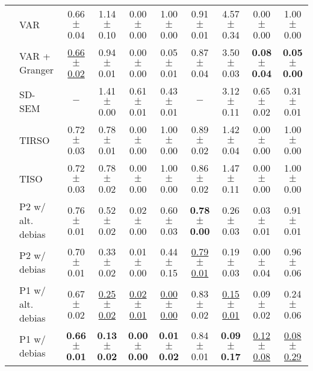 \begin{table*}[t]
\begin{tabular}{@{}c|l|c!{\hspace{.25em}}c!{\hspace{.25em}}c!{\hspace{.25em}}c!{\hspace{.25em}}|c!{\hspace{.25em}}c!{\hspace{.25em}}c!{\hspace{.25em}}c@{}}
& VAR & 0.66{\scriptsize$\pm$0.04} & 1.14{\scriptsize$\pm$0.10} & 0.00{\scriptsize$\pm$0.00} & 1.00{\scriptsize$\pm$0.00} & 0.91{\scriptsize$\pm$0.01} & 4.57{\scriptsize$\pm$0.34} & 0.00{\scriptsize$\pm$0.00} & 1.00{\scriptsize$\pm$0.00} \\
& VAR + Granger & \underline{0.66{\scriptsize$\pm$0.02}} & 0.94{\scriptsize$\pm$0.01} & 0.00{\scriptsize$\pm$0.00} & 0.05{\scriptsize$\pm$0.01} & 0.87{\scriptsize$\pm$0.04} & 3.50{\scriptsize$\pm$0.03} & \textbf{0.08{\scriptsize$\pm$0.04}} & \textbf{0.05{\scriptsize$\pm$0.00}} \\
\midrule
{} & SD-SEM & $-$ & 1.41{\scriptsize$\pm$0.00} & 0.61{\scriptsize$\pm$0.01} & 0.43{\scriptsize$\pm$0.01} & $-$ & 3.12{\scriptsize$\pm$0.11} & 0.65{\scriptsize$\pm$0.02} & 0.31{\scriptsize$\pm$0.01} \\
& TIRSO & 0.72{\scriptsize$\pm$0.03} & 0.78{\scriptsize$\pm$0.01} & 0.00{\scriptsize$\pm$0.00} & 1.00{\scriptsize$\pm$0.00} & 0.89{\scriptsize$\pm$0.02} & 1.42{\scriptsize$\pm$0.04} & 0.00{\scriptsize$\pm$0.00} & 1.00{\scriptsize$\pm$0.00} \\
& TISO & 0.72{\scriptsize$\pm$0.03} & 0.78{\scriptsize$\pm$0.02} & 0.00{\scriptsize$\pm$0.00} & 1.00{\scriptsize$\pm$0.00} & 0.86{\scriptsize$\pm$0.02} & 1.47{\scriptsize$\pm$0.11} & 0.00{\scriptsize$\pm$0.00} & 1.00{\scriptsize$\pm$0.00} \\
& P2 w/ alt. debias & 0.76{\scriptsize$\pm$0.01} & 0.52{\scriptsize$\pm$0.02} & 0.02{\scriptsize$\pm$0.00} & 0.60{\scriptsize$\pm$0.03} & \textbf{0.78{\scriptsize$\pm$0.00}} & 0.26{\scriptsize$\pm$0.03} & 0.03{\scriptsize$\pm$0.01} & 0.91{\scriptsize$\pm$0.01} \\
& P2 w/ debias & 0.70{\scriptsize$\pm$0.01} & 0.33{\scriptsize$\pm$0.02} & 0.01{\scriptsize$\pm$0.00} & 0.44{\scriptsize$\pm$0.15} & \underline{0.79{\scriptsize$\pm$0.01}} & 0.19{\scriptsize$\pm$0.03} & 0.00{\scriptsize$\pm$0.04} & 0.96{\scriptsize$\pm$0.06} \\
& P1 w/ alt. debias & 0.67{\scriptsize$\pm$0.02} & \underline{0.25{\scriptsize$\pm$0.02}} & \underline{0.02{\scriptsize$\pm$0.01}} & \underline{0.00{\scriptsize$\pm$0.00}} & 0.83{\scriptsize$\pm$0.02} & \underline{0.15{\scriptsize$\pm$0.01}} & 0.09{\scriptsize$\pm$0.02} & 0.24{\scriptsize$\pm$0.06} \\
& P1 w/ debias & \textbf{0.66{\scriptsize$\pm$0.01}} & \textbf{0.13{\scriptsize$\pm$0.02}} & \textbf{0.00{\scriptsize$\pm$0.00}} & \textbf{0.01{\scriptsize$\pm$0.02}} & 0.84{\scriptsize$\pm$0.01} & \textbf{0.09{\scriptsize$\pm$0.17}} & \underline{0.12{\scriptsize$\pm$0.08}} & \underline{0.08{\scriptsize$\pm$0.29}} \\
\midrule[0.3pt]\toprule[1pt]
\end{tabular}
\end{table*}